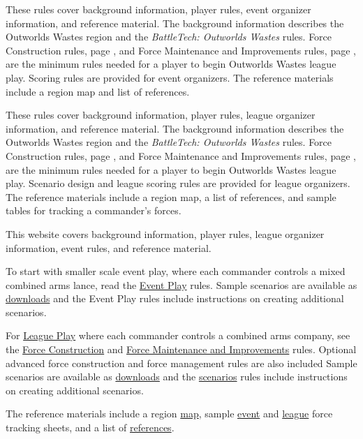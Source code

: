  {
These rules cover background information, player rules, event organizer information, and reference material.
The background information describes the Outworlds Wastes region and the \emph{BattleTech: Outworlds Wastes} rules.
Force Construction rules, page \pageref{subsec:event_force_construction}, and Force Maintenance and Improvements rules, page \pageref{subsec:event_force_maintenance}, are the minimum rules needed for a player to begin Outworlds Wastes league play.
Scoring rules are provided for event organizers.
The reference materials include a region map and list of references.
} {
 {
These rules cover background information, player rules, league organizer information, and reference material.
The background information describes the Outworlds Wastes region and the \emph{BattleTech: Outworlds Wastes} rules.
Force Construction rules, page \pageref{subsec:force_construction}, and Force Maintenance and Improvements rules, page \pageref{subsec:force_maintenance}, are the minimum rules needed for a player to begin Outworlds Wastes league play.
Scenario design and league scoring rules are provided for league organizers.
The reference materials include a region map, a list of references, and sample tables for tracking a commander's forces.
} {
This website covers background information, player rules, league organizer information, event rules, and reference material.

To start with smaller scale event play, where each commander controls a mixed combined arms lance, read the \hyperref[sec:event_play]{Event Play} rules.
Sample scenarios are available as \hyperref[sec:downloads]{downloads} and the Event Play rules include instructions on creating additional scenarios.

For \hyperref[sec:league_play]{League Play} where each commander controls a combined arms company, see the \hyperref[subsec:force_construction]{Force Construction} and \hyperref[subsec:force_maintenance]{Force Maintenance and Improvements} rules.
Optional advanced force construction and force management rules are also included
Sample scenarios are available as \hyperref[sec:downloads]{downloads} and the \hyperref[sec:scenarios]{scenarios} rules include instructions on creating additional scenarios.

The reference materials include a region \hyperref[sec:outworlds_wastes_map]{map}, sample \hyperref[sec:sample_tracking_event]{event} and \hyperref[sec:sample_tracking]{league} force tracking sheets, and a list of \hyperref[sec:references]{references}.
}}
